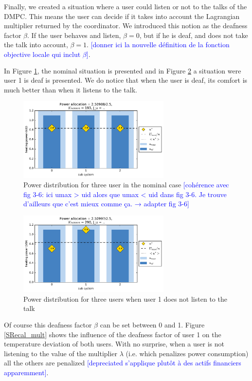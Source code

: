 \documentclass[conference]{IEEEtran}
\newcommand{\rem}[1]{\textcolor{blue}{[#1]}}
\begin{document}

Finally, we created a situation where a user could listen or not to the talks of the DMPC. This means the user can decide if it takes into account the Lagrangian multiplier returned by the coordinator. We introduced this notion as the deafness factor $\beta$. If the user behaves and listen, $\beta = 0$, but if he is deaf,  and does not take the talk into account,  $\beta =1$.
\rem{donner ici la nouvelle définition de la fonction objective locale qui inclut $\beta$}.

In Figure \ref{SRecal_i}, the nominal situation is presented and in Figure \ref{SRecal_} a situation were user 1 is deaf is presented. We do notice that when the user is deaf, its comfort is much better than when it listens to the talk.
\begin{figure}[H]
\centering
\includegraphics[width=3in]{StatRecal_init.pdf}
\caption{Power distribution for three user in the nominal case
\rem{cohérence avec fig 3-6: ici umax > uid alors que umax < uid dans fig 3-6. Je trouve d'ailleurs que c'est mieux comme ça. → adapter fig 3-6}
}
\label{SRecal_i}
\end{figure}

\begin{figure}[H]
\centering
\includegraphics[width=3in]{StatRecal.pdf}
\caption{Power distribution for three users when user 1 does not listen to the talk}
\label{SRecal_}
\end{figure}
Of course this deafness factor $\beta$ can be set between 0 and 1. Figure \ref{SRecal_mult} shows the influence of the deafness factor of user 1 on the temperature deviation of both users. With no surprise, when a user is not listening to the value of the multiplier $\lambda$ (i.e. which penalizes power consumption) all the others are penalized \rem{depreciated s'applique plutôt à des actifs financiers apparemment}.
\end{document}
